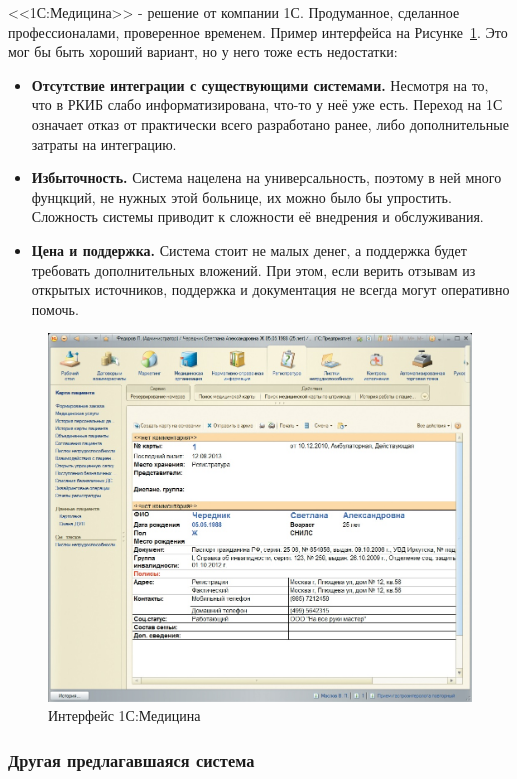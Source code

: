 \documentclass[a4paper,article]{article}
\begin{document}
        <<1С:Медицина>> - решение от компании 1С. Продуманное, сделанное профессионалами, проверенное временем. Пример интерфейса на Рисунке~\ref{fig:Интерфейс 1С:Медицина}. Это мог бы быть хороший вариант, но у него тоже есть недостатки:

        \begin{itemize}[nolistsep]
            \item \textbf{Отсутствие интеграции с существующими системами.} Несмотря на то, что в РКИБ слабо информатизирована, что-то у неё уже есть. Переход на 1С означает отказ от практически всего разработано ранее, либо дополнительные затраты на интеграцию.
            \item \textbf{Избыточность.} Система нацелена на универсальность, поэтому в ней много фунцкций, не нужных этой больнице, их можно было бы упростить. Сложность системы приводит к сложности её внедрения и обслуживания.
            \item \textbf{Цена и поддержка.} Система стоит не малых денег, а поддержка будет требовать дополнительных вложений. При этом, если верить отзывам из открытых источников, поддержка и документация не всегда могут оперативно помочь.
        \end{itemize}

        \begin{figure}[h]

            \centering

            \includegraphics[width=0.6\linewidth]{Интерфейс 1С:Медицина.png}

            \caption{\centering Интерфейс 1С:Медицина}

            \label{fig:Интерфейс 1С:Медицина}

        \end{figure}

    \subsubsection{Другая предлагавшаяся система}
\end{document}
